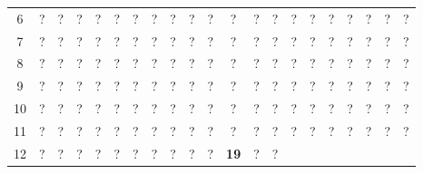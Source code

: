 \begin{figure}[H]
\begin{center}
{\begin{tabular}{|c|*{20}{c|}}
          6             & ?              & ?            & ?             & ?
          & ?              & ?            & ?             & ?           &
          ?             & ?              & ?            & ?             & ?
          & ?              & ?            & ?             & ?
          & ?              & ?            & ?                             \\
          7             & ?              & ?            & ?             & ?
          & ?              & ?            & ?             & ?           &
          ?             & ?              & ?            & ?             & ?
          & ?              & ?            & ?             & ?
          & ?              & ?            & ?                             \\
          8             & ?              & ?            & ?             & ?
          & ?              & ?            & ?             & ?           &
          ?             & ?              & ?            & ?             & ?
          & ?              & ?            & ?             & ?
          & ?              & ?            & ?                             \\
          9             & ?              & ?            & ?             & ?
          & ?              & ?            & ?             & ?           &
          ?             & ?              & ?            & ?             & ?
          & ?              & ?            & ?             & ?
          & ?              & ?            & ?                             \\
          10            & ?              & ?            & ?             & ?
          & ?              & ?            & ?             & ?           &
          ?             & ?              & ?            & ?             & ?
          & ?              & ?            & ?             & ?
          & ?              & ?            & ?                             \\
          11            & ?              & ?            & ?             & ?
          & ?              & ?            & ?             & ?           &
          ?             & ?              & ?            & ?             & ?
          & ?              & ?            & ?             & ?
          & ?              & ?            & ?                             \\
          12            & ?              & ?            & ?             & ?
          & ?              & ?            & ?             & ?           &
          ?             & ?              & {\bf{19}}    & ?             & ?

\end{tabular}}
\end{center}
\end{figure}
